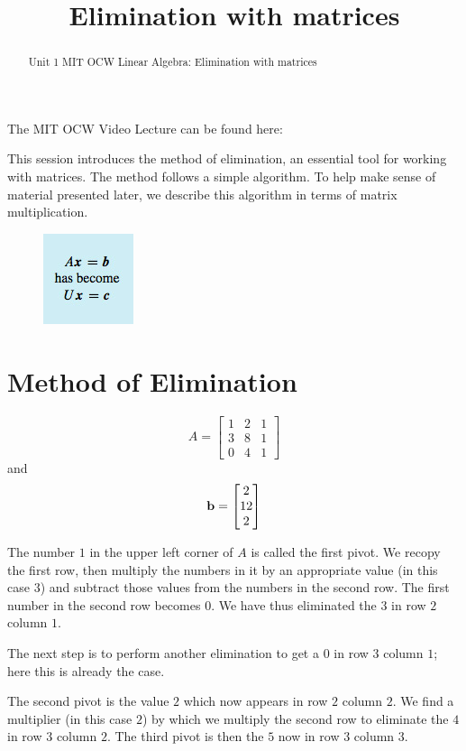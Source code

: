 \documentclass{ximera}
\title{Elimination with matrices}
\begin{document}
\begin{abstract}
  Unit 1 MIT OCW Linear Algebra: Elimination with matrices
\end{abstract}
\maketitle

The MIT OCW Video Lecture can be found
here:

This session introduces the method of elimination, an essential tool for working 
with matrices. The method follows a simple algorithm. To help make sense of material 
presented later, we describe this algorithm in terms of matrix multiplication.

\begin{figure}[H]
\begin{image}
\includegraphics{1_2.jpg}
\end{image}
\end{figure}

\section*{Method of Elimination}

\[A = \begin{bmatrix} 1&2&1\\3&8&1\\0&4&1 \end{bmatrix}\]and\[\mathbf{b} = \begin{bmatrix}2\\12\\2\end{bmatrix}\]


The number $1$ in the upper left corner of $A$ is called the first pivot. We 
recopy the first row, then multiply the numbers in it by an appropriate value 
(in this case $3$) and subtract those values from the numbers in the second row.
The first number in the second row becomes $0$. We have thus eliminated the $3$ 
in row $2$ column $1$.

The next step is to perform another elimination to get a $0$ in row $3$ column $1$; 
here this is already the case.

The second pivot is the value $2$ which now appears in row $2$ column $2$. 
We find a multiplier (in this case $2$) by which we multiply the second row to 
eliminate the $4$ in row $3$ column $2$. The third pivot is then the $5$ 
now in row $3$ column $3$.
\end{document}

